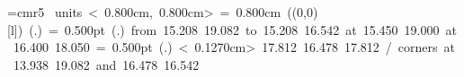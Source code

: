 \font\thinlinefont=cmr5
\mbox{\beginpicture
\setcoordinatesystem units < 0.800cm, 0.800cm>
\unitlength= 0.800cm
\linethickness=1pt
\setplotsymbol ({\makebox(0,0)[l]{\tencirc{}}})
\setshadesymbol ({\thinlinefont .})
\setlinear
%
%
\linethickness= 0.500pt
\setplotsymbol ({\thinlinefont .})
\putrule from 15.208 19.082 to 15.208 16.542
 at 15.450 19.000
 at 16.400 18.050
%
%
\linethickness= 0.500pt
\setplotsymbol ({\thinlinefont .})
\setdashes < 0.1270cm>
 17.812 16.478 17.812 /
\linethickness=0pt
\putrectangle corners at 13.938 19.082 and 16.478 16.542
\endpicture}
